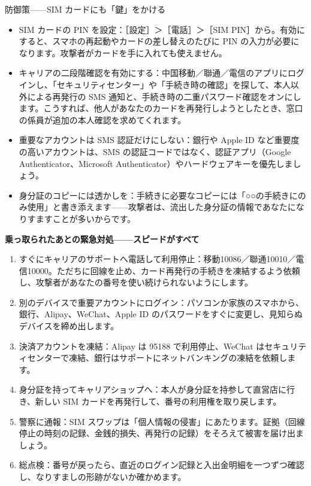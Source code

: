 \begin{tcbwarn}{防御策——SIM カードにも「鍵」をかける}
\begin{itemize}
  \item SIM カードの PIN を設定：［設定］＞［電話］＞［SIM PIN］から。有効にすると、スマホの再起動やカードの差し替えのたびに PIN の入力が必要になります。攻撃者がカードを手に入れても使えません。
  \item キャリアの二段階確認を有効にする：中国移動／聯通／電信のアプリにログインし、「セキュリティセンター」や「手続き時の確認」を探して、本人以外による再発行の SMS 通知と、手続き時の二重パスワード確認をオンにします。こうすれば、他人があなたのカードを再発行しようとしたとき、窓口の係員が追加の本人確認を求めてくれます。
  \item 重要なアカウントは SMS 認証だけにしない：銀行や Apple ID など重要度の高いアカウントは、SMS の認証コードではなく、認証アプリ（Google Authenticator、Microsoft Authenticator）やハードウェアキーを優先しましょう。
  \item 身分証のコピーには透かしを：手続きに必要なコピーには「○○の手続きにのみ使用」と書き添えます——攻撃者は、流出した身分証の情報であなたになりすますことが多いからです。
\end{itemize}

\end{tcbwarn}

\textbf{乗っ取られたあとの緊急対処——スピードがすべて}\par

\begin{enumerate}
  \item すぐにキャリアのサポートへ電話して利用停止：移動10086／聯通10010／電信10000。ただちに回線を止め、カード再発行の手続きを凍結するよう依頼し、攻撃者があなたの番号を使い続けられないようにします。
  \item 別のデバイスで重要アカウントにログイン：パソコンか家族のスマホから、銀行、Alipay、WeChat、Apple ID のパスワードをすぐに変更し、見知らぬデバイスを締め出します。
  \item 決済アカウントを凍結：Alipay は 95188 で利用停止、WeChat はセキュリティセンターで凍結、銀行はサポートにネットバンキングの凍結を依頼します。
  \item 身分証を持ってキャリアショップへ：本人が身分証を持参して直営店に行き、新しい SIM カードを再発行して、番号の利用権を取り戻します。
  \item 警察に通報：SIM スワップは「個人情報の侵害」にあたります。証拠（回線停止の時刻の記録、金銭的損失、再発行の記録）をそろえて被害を届け出ましょう。
  \item 総点検：番号が戻ったら、直近のログイン記録と入出金明細を一つずつ確認し、なりすましの形跡がないか確かめます。
\end{enumerate}

